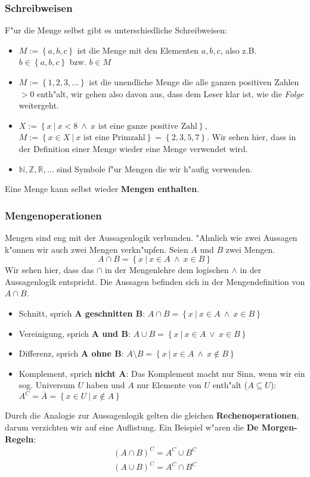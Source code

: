 \subsubsection{Schreibweisen}
F"ur die Menge selbst gibt es unterschiedliche Schreibweisen:
\begin{itemize}
\item $M := \left\{a, b, c\right\}$ ist die Menge mit den Elementen $a,b,c$, also z.B. $b \in  \left\{a, b, c\right\}$ bzw. $b \in M$
\item $M := \left\{1, 2, 3, \ldots \right\}$ ist die unendliche Menge die alle ganzen positiven Zahlen $> 0$ enth"alt, wir gehen also davon aus, dass dem Leser klar ist, wie die \textit{Folge} weitergeht.
\item $X:= \left\{x \ | \ x < 8 \ \land \ x \text{ ist eine ganze positive Zahl} \right\}$,\\$M := \left\{x \in X \ | \ x \text{ ist eine Primzahl} \right\} = \left\{2, 3, 5, 7\right\}$. Wir sehen hier, dass in der Definition einer Menge wieder eine Menge verwendet wird.
\item $\mathbb{N}, \mathbb{Z}, \mathbb{R}, \ldots$ sind Symbole f"ur Mengen die wir h"aufig verwenden.
\end{itemize}
Eine Menge kann selbst wieder \textbf{Mengen enthalten}. 

\subsubsection{Mengenoperationen}
Mengen sind eng mit der Aussagenlogik verbunden. "Ahnlich wie zwei Aussagen k"onnen wir auch zwei Mengen verkn"upfen. Seien $A$ und $B$ zwei Mengen.
\begin{equation*}
A \cap B = \left\{ x \ | \ x \in A \ \land \ x \in B \right\}
\end{equation*}
Wir sehen hier, dass das $\cap$ in der Mengenlehre dem logischen $\land$ in der Aussagenlogik entspricht. Die Aussagen  befinden sich in der Mengendefinition von $A \cap B$.
\begin{itemize}
\item Schnitt, sprich \textbf{A geschnitten B}: $A \cap B =  \left\{x \ | \ x \in A \ \land \ x \in B \right\}$
\item Vereinigung, sprich \textbf{A und B}: $A \cup B =  \left\{x \ | \ x \in A \ \lor \ x \in B \right\}$
\item Differenz, sprich \textbf{A ohne B}: $A \setminus B =  \left\{x \ | \ x \in A \ \land \ x \notin B \right\}$
\item Komplement, sprich \textbf{nicht A}: Das Komplement macht nur Sinn, wenn wir ein sog. Universum $U$ haben und $A$ nur Elemente von $U$ enth"alt ($A \subseteq U$): $A^C = \bar{A} = \left\{x \in U \ | \ x \notin A \right\}$
\end{itemize}
Durch die Analogie zur Aussagenlogik gelten die gleichen \textbf{Rechenoperationen}, darum verzichten wir auf eine Auflistung. Ein Beispiel w"aren die \textbf{De Morgen-Regeln}:
\begin{gather*}
(A \cap B)^C = A^C \cup B^C \\
(A \cup B)^C = A^C \cap B^C 
\end{gather*} 

